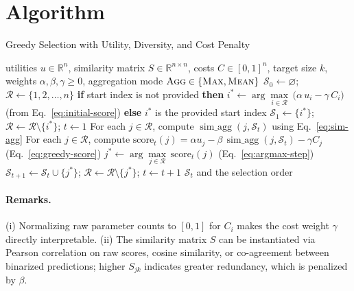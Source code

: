 \documentclass{article}
\begin{document}
\section*{Algorithm}
\begin{algorithm}[H]
\caption{Greedy Selection with Utility, Diversity, and Cost Penalty}
\label{alg:greedy}
\begin{algorithmic}[1]
\Require utilities $u\in\mathbb{R}^n$, similarity matrix $S\in\mathbb{R}^{n\times n}$, costs $C\in[0,1]^n$, target size $k$, weights $\alpha,\beta,\gamma\ge 0$, aggregation mode $\textsc{Agg}\in\{\textsc{Max},\textsc{Mean}\}$
\State $\mathcal{S}_0 \gets \varnothing$; $\mathcal{R} \gets \{1,2,\dots,n\}$ 
\State \textbf{if} start index is not provided \textbf{then}
\State \hspace{1em} $i^* \gets \arg\max\limits_{i\in\mathcal{R}}\,\big(\alpha\,u_i - \gamma\,C_i\big)$ \hfill (from Eq.~\eqref{eq:initial-score})
\State \textbf{else}\; $i^*$ is the provided start index
\State $\mathcal{S}_1 \gets \{i^*\}$; $\mathcal{R} \gets \mathcal{R}\setminus\{i^*\}$; $t\gets 1$
\State For each $j\in\mathcal{R}$, compute $\operatorname{sim\_agg}(j,\mathcal{S}_t)$ using Eq.~\eqref{eq:sim-agg}
\State For each $j\in\mathcal{R}$, compute $\text{score}_t(j) = \alpha u_j - \beta\,\operatorname{sim\_agg}(j,\mathcal{S}_t) - \gamma C_j$ \hfill (Eq.~\eqref{eq:greedy-score})
\State $j^* \gets \arg\max\limits_{j\in\mathcal{R}}\, \text{score}_t(j)$ \hfill (Eq.~\eqref{eq:argmax-step})
\State $\mathcal{S}_{t+1} \gets \mathcal{S}_t \cup \{j^*\}$; $\mathcal{R} \gets \mathcal{R}\setminus\{j^*\}$; $t\gets t+1$
\EndWhile
\State \Return $\mathcal{S}_t$ and the selection order
\end{algorithmic}
\end{algorithm}

\paragraph{Remarks.}
(i) Normalizing raw parameter counts to $[0,1]$ for $C_i$ makes the cost weight $\gamma$ directly interpretable. (ii) The similarity matrix $S$ can be instantiated via Pearson correlation on raw scores, cosine similarity, or co-agreement between binarized predictions; higher $S_{jk}$ indicates greater redundancy, which is penalized by $\beta$.
\end{document}
